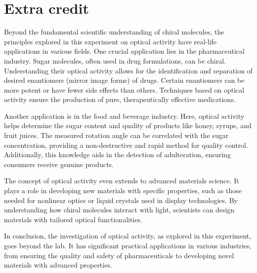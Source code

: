 \documentclass[10pt]{article}
\begin{document}
\section{Extra credit}

Beyond the fundamental scientific understanding of chiral molecules, the principles explored in this experiment on optical activity have real-life applications in various fields. One crucial application lies in the pharmaceutical industry. Sugar molecules, often used in drug formulations, can be chiral. Understanding their optical activity allows for the identification and separation of desired enantiomers (mirror image forms) of drugs. Certain enantiomers can be more potent or have fewer side effects than others. Techniques based on optical activity ensure the production of pure, therapeutically effective medications.

Another application is in the food and beverage industry. Here, optical activity helps determine the sugar content and quality of products like honey, syrups, and fruit juices. The measured rotation angle can be correlated with the sugar concentration, providing a non-destructive and rapid method for quality control. Additionally, this knowledge aids in the detection of adulteration, ensuring consumers receive genuine products.

The concept of optical activity even extends to advanced materials science. It plays a role in developing new materials with specific properties, such as those needed for nonlinear optics or liquid crystals used in display technologies. By understanding how chiral molecules interact with light, scientists can design materials with tailored optical functionalities.

In conclusion, the investigation of optical activity, as explored in this experiment, goes beyond the lab. It has significant practical applications in various industries, from ensuring the quality and safety of pharmaceuticals to developing novel materials with advanced properties.

\printbibliography
\end{document}
